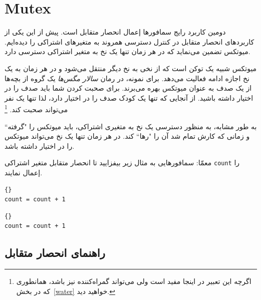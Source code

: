 \documentclass{book}
\newcommand{\clearemptydoublepage}{\newpage\cleardoublepage}
\begin{document}
\section{Mutex}

    دومین کاربرد رایج سمافورها إعمال انحصار متقابل است.
    پیش از این یکی از کاربردهای انحصار متقابل در کنترل دسترسی همروند به متغیرهای اشتراکی را دیده‌ایم.    میوتکس
    تضمین می‌نماید که در هر زمان تنها یک نخ به متغیر اشتراکی دسترسی دارد. 

    میوتکس شبیه یک توکن است که از نخی به نخ دیگر منتقل می‌شود و در هر زمان به یک نخ اجازه ادامه فعالیت می‌دهد. 
    برای نمونه، در رمان \emph{سالار مگس‌ها} یک گروه از بچه‌ها از یک صدف به عنوان  میوتکس
    بهره می‌برند. برای صحبت کردن شما باید صدف را در اختیار داشته باشید. از آنجایی که تنها یک کودک صدف را در اختیار دارد، لذا تنها یک نفر می‌تواند 
    صحبت کند. \footnote{اگرچه  این تعبیر در اینجا مفید است ولی می‌تواند گمراه‌‌کننده نیز  باشد، همانطوری که در بخش~\ref{water} خواهید دید. }

    به طور مشابه، به منظور دسترسی یک نخ به متغیری اشتراکی، باید  میوتکس را "گرفته`` و زمانی که کارش تمام شد آن را "رها`` کند. 
    در هر زمان تنها یک نخ می‌تواند  میوتکس را در اختیار داشته باشد. 
    
    معمّا: سمافورهایی به مثال زیر بیفزایید تا انحصار متقابل متغیر اشتراکی \texttt{count} را إعمال نمایند. 
    
\begin{latin}
\begin{minipage}[t]{2in}
\begin{latin}
\begin{lstlisting}[title=\rl{نخ \lr{A}}]{}
count = count + 1
\end{lstlisting}
\end{latin}
\end{minipage}
\hfill
\begin{minipage}[t]{2in}
\begin{latin}
\begin{lstlisting}[title=\rl{نخ \lr{B}}]{}
count = count + 1
\end{lstlisting}
\end{latin}
\end{minipage}
\end{latin}

\clearemptydoublepage
\subsection{راهنمای انحصار متقابل}
\end{document}
